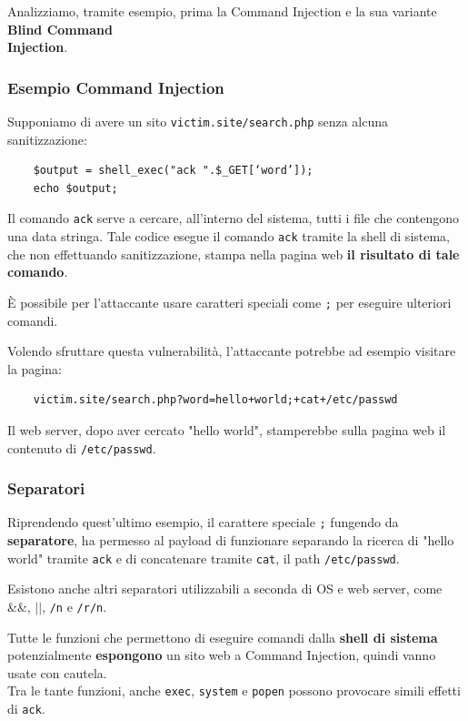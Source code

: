 \documentclass{article}
\begin{document}
Analizziamo, tramite esempio, prima la Command Injection e la sua variante \textbf{Blind Command\\ Injection}.

\subsubsection{Esempio Command Injection}
Supponiamo di avere un sito \verb|victim.site/search.php| senza alcuna sanitizzazione:
\begin{verbatim}
	$output = shell_exec("ack ".$_GET[‘word’]);
	echo $output;
\end{verbatim}

Il comando \verb|ack| serve a cercare, all'interno del sistema, tutti i file che contengono una data stringa. Tale codice esegue il comando \verb|ack| tramite la shell di sistema, che non effettuando sanitizzazione, stampa nella pagina web \textbf{il risultato di tale comando}.

È possibile per l'attaccante usare caratteri speciali come \verb|;| per eseguire ulteriori comandi.

Volendo sfruttare questa vulnerabilità, l'attaccante potrebbe ad esempio visitare la pagina:
\begin{verbatim}
	victim.site/search.php?word=hello+world;+cat+/etc/passwd
\end{verbatim}
Il web server, dopo aver cercato "hello world", stamperebbe sulla pagina web il contenuto di \verb|/etc/passwd|.\\

\subsubsection{Separatori}
Riprendendo quest'ultimo esempio, il carattere speciale \verb|;| fungendo da \textbf{separatore}, ha permesso al payload di funzionare separando la ricerca di "hello world" tramite \verb|ack| e di concatenare tramite \verb|cat|, il path \verb|/etc/passwd|.

Esistono anche altri separatori utilizzabili a seconda di OS e web server, come \&\&, $||$, \verb|/n| e \verb|/r/n|.

Tutte le funzioni che permettono di eseguire comandi dalla \textbf{shell di sistema} potenzialmente \textbf{espongono} un sito web a Command Injection, quindi vanno usate con cautela.\\ Tra le tante funzioni, anche \verb|exec|, \verb|system| e \verb|popen| possono provocare simili effetti di \verb|ack|.
\end{document}
